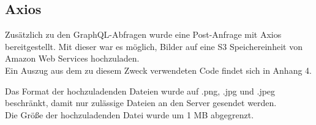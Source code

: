\subsection{Axios}
\begin{comment}
\begin{quote}
  Axios ist ein Promise-basierter HTTP-Client für node.js und den browser. Auf der Server-Seite wir das modul HTTP verwendet, während im Browser XMLHttpRequests (ajax) ausgeführt werden.
\end{quote}\footnote{Vgl. u.a. \cite{AX1}}
\end{comment}

Zusätzlich zu den GraphQL-Abfragen wurde eine Post-Anfrage mit Axios bereitgestellt.
Mit dieser war es möglich, Bilder auf eine S3 Speichereinheit von Amazon Web Services hochzuladen.
\\
Ein Auszug aus dem zu diesem Zweck verwendeten Code findet sich in Anhang 4.


\begin{flushleft}
Das Format der hochzuladenden Dateien wurde auf .png, .jpg und .jpeg beschränkt, damit nur zulässige Dateien an den Server gesendet werden.
\\
Die Größe der hochzuladenden Datei wurde um 1 MB abgegrenzt.
\end{flushleft}
